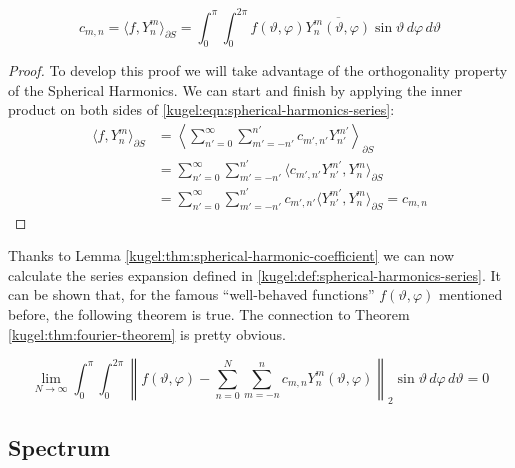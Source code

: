 \begin{lemma}
  \label{kugel:thm:spherical-harmonic-coefficient}
  \begin{equation*}
    c_{m,n} 
    = \langle f, Y^m_n \rangle_{\partial S}
    = \int_0^\pi \int_0^{2\pi}
      f(\vartheta,\varphi) \overline{Y^m_n(\vartheta,\varphi)}
      \sin\vartheta \,d\varphi\,d\vartheta
  \end{equation*}
\end{lemma}

\begin{proof}
  To develop this proof we will take advantage of the orthogonality property of
  the Spherical Harmonics. We can start and finish by applying the inner product
  on both sides of \eqref{kugel:eqn:spherical-harmonics-series}:
  \begin{align*}
    \langle f, Y^{m}_{n} \rangle_{\partial S}
    &= \left\langle \sum_{n'=0}^\infty \sum_{m' =-n'}^{n'}
      c_{m',n'} Y^{m'}_{n'} \right\rangle_{\partial S}  \\
    &= \sum_{n'=0}^\infty \sum_{m' =-n'}^{n'}
      \langle c_{m',n'} Y^{m'}_{n'}, Y^{m}_{n} \rangle_{\partial S} \\
    &= \sum_{n'=0}^\infty \sum_{m' =-n'}^{n'} c_{m',n'}
      \langle Y^{m'}_{n'}, Y^{m}_{n} \rangle_{\partial S} = c_{m,n}
  \end{align*}
\end{proof}

Thanks to Lemma \ref{kugel:thm:spherical-harmonic-coefficient} we can now
calculate the series expansion defined in
\ref{kugel:def:spherical-harmonics-series}. It can be shown that, for the famous
``well-behaved functions'' $f(\vartheta, \varphi)$ mentioned before, the
following theorem is true.  The connection to Theorem
\ref{kugel:thm:fourier-theorem} is pretty obvious.

\begin{theorem}
  \label{fourier-theorem-spherical-surface}
  \begin{equation*}
    \lim_{N \to \infty}
    \int_0^\pi \int_0^{2\pi} \left\| f(\vartheta,\varphi) - \sum_{n=0}^N\sum_{m=-n}^n c_{m,n} Y^m_n(\vartheta,\varphi)
    \right\|_2 \sin\vartheta \,d\varphi\,d\vartheta  = 0
  \end{equation*}
\end{theorem}

\subsection{Spectrum}

